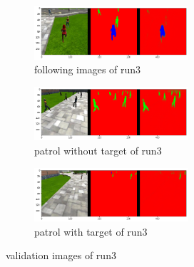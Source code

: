 \documentclass[paper=a4, fontsize=11pt]{scrartcl} %
\numberwithin{equation}{section} %
\numberwithin{figure}{section} %
\numberwithin{table}{section} %
\begin{document}
\begin{figure}[ht]
	\begin{subfigure}{0.33\textwidth}
	\includegraphics[width=0.9\linewidth, height=2cm]{./imgs/following_images3_1.png} 
	\caption{following images of run3}
	\label{fig:subfollowing_images31}
	\end{subfigure}
	\begin{subfigure}{0.33\textwidth}
	\includegraphics[width=0.9\linewidth, height=2cm]{./imgs/patrol_non_targ3_1.png}
	\caption{patrol without target of run3}
	\label{fig:subpatrol_non_targ31}
	\end{subfigure}
	\begin{subfigure}{0.33\textwidth}
	\includegraphics[width=0.9\linewidth, height=2cm]{./imgs/patrol_with_targ3_1.png}
	\caption{patrol with target of run3}
	\label{fig:subpatrol_with_targ31}
	\end{subfigure}

	\caption{validation images of run3}
	\label{fig:outputimages31}
\end{figure}
\end{document}
